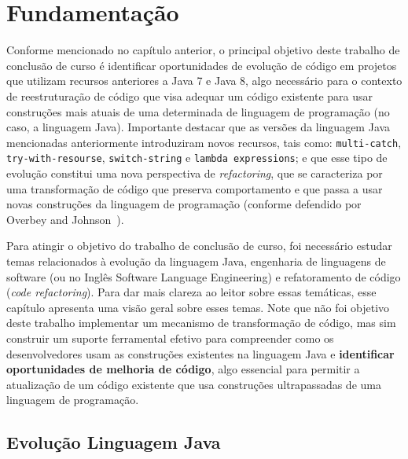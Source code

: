 %
%
\chapter{Fundamentaç\~{a}o}

Conforme mencionado no cap\'{i}tulo anterior, o principal objetivo deste trabalho de conclus\~{a}o de curso \'{e} 
identificar oportunidades de evoluç\~{a}o de c\'{o}digo em projetos que utilizam recursos anteriores a Java 7 e Java 8, 
algo necess\'{a}rio para o contexto de reestrutura\c c\~{a}o de c\'{o}digo que visa adequar um c\'{o}digo 
existente para usar constru\c c\~{o}es mais atuais de uma determinada de linguagem de programa\c c\~{a}o 
(no caso, a linguagem Java). Importante destacar que as vers\~{o}es da linguagem Java mencionadas anteriormente
introduziram novos recursos, tais como: \texttt{multi-catch}, \texttt{try-with-resourse}, \texttt{switch-string} 
e \texttt{lambda expressions}; e que esse tipo de evoluç\~{a}o constitui uma nova perspectiva de \textit{refactoring}, que se caracteriza 
por uma transforma\c c\~{a}o de c\'{o}digo que preserva comportamento e que passa a usar  
novas constru\c c\~{o}es da linguagem de programa\c c\~{a}o (conforme defendido por Overbey and Johnson~\cite{Overbey:2009}). 

Para atingir o objetivo do trabalho de conclus\~{a}o de curso, foi necess\'{a}rio estudar temas relacionados 
\`{a} evolu\c c\~{a}o da linguagem Java, engenharia de linguagens de software (ou no Ingl\^{e}s Software 
Language Engineering) e refatoramento de c\'{o}digo (\emph{code refactoring}).  Para dar mais clareza ao leitor 
sobre essas tem\'{a}ticas, esse cap\'{i}tulo apresenta uma vis\~{a}o geral sobre esses temas. Note que n\~{a}o foi objetivo
deste trabalho implementar um mecanismo de transforma\c c\~{a}o de c\'{o}digo, mas sim construir um suporte ferramental 
efetivo para compreender como os desenvolvedores usam as constru\c c\~{o}es existentes na linguagem Java e {\bf identificar 
oportunidades de melhoria de c\'{o}digo}, algo essencial para permitir a atualiza\c c\~{a}o de um c\'{o}digo existente 
que usa constru\c c\~{o}es ultrapassadas de uma linguagem de programa\c c\~{a}o. 
 
 
 
\section{Evoluç\~{a}o Linguagem Java}\label{sec:evolucaoJava}

